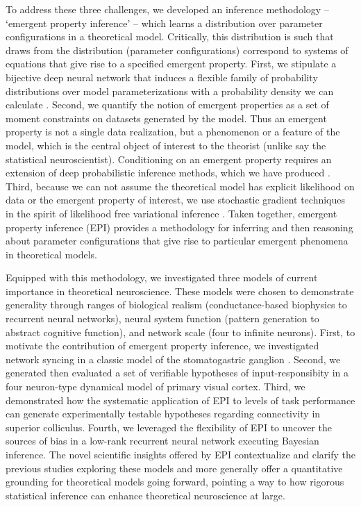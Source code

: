 \documentclass[11pt]{article}
\begin{document}
To address these three challenges, we developed an inference methodology -- `emergent property inference' -- which learns a distribution over parameter configurations in a theoretical model.  Critically, this distribution is such that draws from the distribution (parameter configurations) correspond to systems of equations that give rise to a specified emergent property.  
First, we stipulate a bijective deep neural network that induces a flexible family of probability distributions over model parameterizations with a probability density we can calculate \cite{rezende2015variational, dinh2016density, papamakarios2017masked}.
Second, we quantify the notion of emergent properties as a set of moment constraints on datasets generated by the model.  
Thus an emergent property is not a single data realization, but a phenomenon or a feature of the model, which is the central object of interest to the theorist (unlike say the statistical neuroscientist).  
Conditioning on an emergent property requires an extension of deep probabilistic inference methods, which we have produced \cite{loaiza2017maximum}.
Third,  because we can not assume the theoretical model has explicit likelihood on data or the emergent property of interest, we use stochastic gradient techniques in the spirit of likelihood free variational inference \cite{tran2017hierarchical}.    
Taken together, emergent property inference (EPI) provides a methodology for inferring and then reasoning about parameter configurations that give rise to particular emergent phenomena in theoretical models.

Equipped with this methodology, we investigated three models of current importance in theoretical neuroscience.
These models were chosen to demonstrate generality through ranges of biological realism (conductance-based biophysics to recurrent neural networks), neural system function (pattern generation to abstract cognitive function), and network scale (four to infinite neurons).
First, to motivate the contribution of emergent property inference, we investigated network syncing in a classic model of the stomatogastric ganglion \cite{gutierrez2013multiple}.   
Second, we generated then evaluated a set of verifiable hypotheses of input-responsibity in a four neuron-type dynamical model of primary visual cortex.
Third, we demonstrated how the systematic application of EPI to levels of task performance can generate experimentally testable hypotheses regarding connectivity in superior colliculus.  
Fourth, we leveraged the flexibility of EPI to uncover the sources of bias in a low-rank recurrent neural network executing Bayesian inference.  
The novel scientific insights offered by EPI contextualize and clarify the previous studies exploring these models \cite{gutierrez2013multiple, litwin2016inhibitory, duan2018collicular, mastrogiuseppe2018linking} and more generally offer a quantitative grounding for theoretical models  going forward, pointing a way to how rigorous statistical inference can enhance theoretical neuroscience at large.
\end{document}
